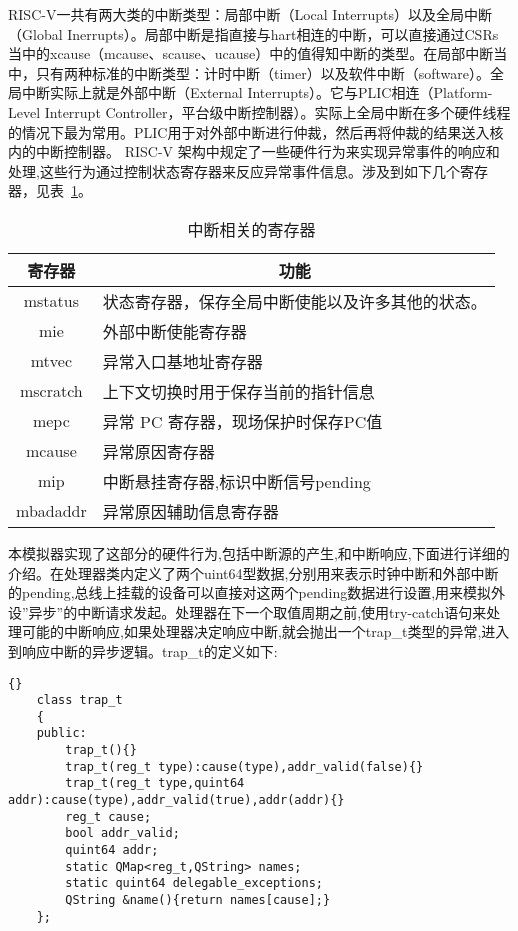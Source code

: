 RISC-V一共有两大类的中断类型：局部中断（Local Interrupts）以及全局中断（Global Inerrupts）。局部中断是指直接与hart相连的中断，可以直接通过CSRs当中的xcause（mcause、scause、ucause）中的值得知中断的类型。在局部中断当中，只有两种标准的中断类型：计时中断（timer）以及软件中断（software）。全局中断实际上就是外部中断（External Interrupts）。它与PLIC相连（Platform-Level Interrupt Controller，平台级中断控制器）。实际上全局中断在多个硬件线程的情况下最为常用。PLIC用于对外部中断进行仲裁，然后再将仲裁的结果送入核内的中断控制器。
RISC-V 架构中规定了一些硬件行为来实现异常事件的响应和处理,这些行为通过控制状态寄存器来反应异常事件信息。涉及到如下几个寄存器，见表~\ref{tab:csr}。
\begin{table}[h]
  \centering
  \caption{中断相关的寄存器}
  \label{tab:csr}
  \begin{tabular}{cl}
    \toprule
寄存器	& \multicolumn{1}{c}{功能}\\
    \midrule
    mstatus	& \multicolumn{1}{m{9cm}}{状态寄存器，保存全局中断使能以及许多其他的状态。}\\ \hline
    mie	& \multicolumn{1}{m{9cm}}{外部中断使能寄存器}\\ \hline
    mtvec	& \multicolumn{1}{m{9cm}}{异常入口基地址寄存器}\\ \hline
    mscratch & \multicolumn{1}{m{9cm}}{上下文切换时用于保存当前的指针信息}\\ \hline
    mepc & \multicolumn{1}{m{9cm}}{异常 PC 寄存器，现场保护时保存PC值}\\ \hline
    mcause & \multicolumn{1}{m{9cm}}{异常原因寄存器}\\ \hline
    mip	& \multicolumn{1}{m{9cm}}{中断悬挂寄存器,标识中断信号pending}\\ \hline
    mbadaddr & \multicolumn{1}{m{9cm}}{异常原因辅助信息寄存器}\\
    \bottomrule
  \end{tabular}
\end{table}

本模拟器实现了这部分的硬件行为,包括中断源的产生,和中断响应,下面进行详细的介绍。在处理器类内定义了两个uint64型数据,分别用来表示时钟中断和外部中断的pending,总线上挂载的设备可以直接对这两个pending数据进行设置,用来模拟外设”异步”的中断请求发起。处理器在下一个取值周期之前,使用try-catch语句来处理可能的中断响应,如果处理器决定响应中断,就会抛出一个trap\_t类型的异常,进入到响应中断的异步逻辑。trap\_t的定义如下:
\begin{lstlisting}{}
    class trap_t
    {
    public:
        trap_t(){}
        trap_t(reg_t type):cause(type),addr_valid(false){}
        trap_t(reg_t type,quint64 addr):cause(type),addr_valid(true),addr(addr){}
        reg_t cause;
        bool addr_valid;
        quint64 addr;
        static QMap<reg_t,QString> names;
        static quint64 delegable_exceptions;
        QString &name(){return names[cause];}
    };        
\end{lstlisting}


